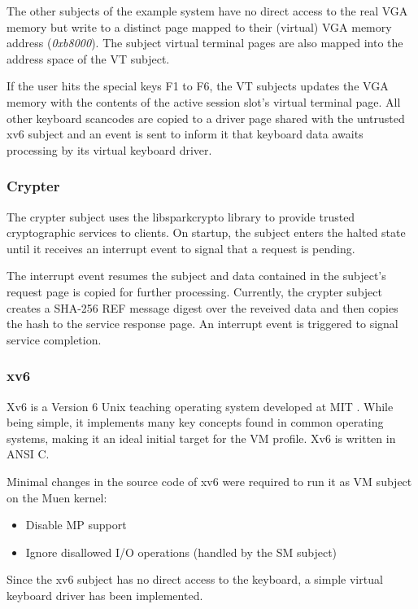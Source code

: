 The other subjects of the example system have no direct access to the real VGA
memory but write to a distinct page mapped to their (virtual) VGA memory
address (\emph{0xb8000}). The subject virtual terminal pages are also mapped
into the address space of the VT subject.

If the user hits the special keys F1 to F6, the VT subjects updates the VGA
memory with the contents of the active session slot's virtual terminal page.
All other keyboard scancodes are copied to a driver page shared with the
untrusted xv6 subject and an event is sent to inform it that keyboard data
awaits processing by its virtual keyboard driver.

\subsubsection{Crypter}
The crypter subject uses the libsparkcrypto \cite{libsparkcrypto} library to
provide trusted cryptographic services to clients. On startup, the subject
enters the halted state until it receives an interrupt event to signal that a
request is pending.

The interrupt event resumes the subject and data contained in the subject's
request page is copied for further processing. Currently, the crypter subject
creates a SHA-256 REF message digest over the reveived data and then copies the
hash to the service response page. An interrupt event is triggered to signal
service completion.

\subsubsection{xv6}
Xv6 is a Version 6 Unix \cite{wiki:unix6} teaching operating system
developed at MIT \cite{xv6}. While being simple, it implements many key
concepts found in common operating systems, making it an ideal initial target
for the VM profile. Xv6 is written in ANSI C.

Minimal changes in the source code of xv6 were required to run it as VM subject
on the Muen kernel:
\begin{itemize}
	\item Disable MP support
	\item Ignore disallowed I/O operations (handled by the SM subject)
\end{itemize}

Since the xv6 subject has no direct access to the keyboard, a simple virtual
keyboard driver has been implemented.


